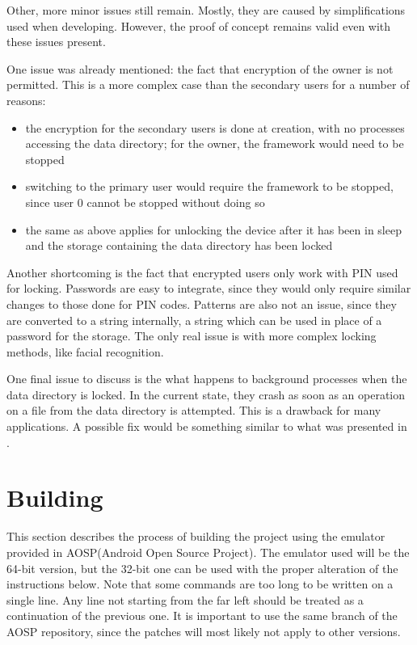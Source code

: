 Other, more minor issues still remain. Mostly, they are caused by simplifications used when developing. However, the proof of concept remains valid even with these issues present.

One issue was already mentioned: the fact that encryption of the owner is not permitted. This is a more complex case than the secondary users for a number of reasons:
\begin{itemize}
\item the encryption for the secondary users is done at creation, with no processes accessing the data directory; for the owner, the framework would need to be stopped
\item switching to the primary user would require the framework to be stopped, since user 0 cannot be stopped without doing so
\item the same as above applies for unlocking the device after it has been in sleep and the storage containing the data directory has been locked
\end{itemize}

Another shortcoming is the fact that encrypted users only work with PIN used for locking. Passwords are easy to integrate, since they would only require similar changes to those done for PIN codes. Patterns are also not an issue, since they are converted to a string internally, a string which can be used in place of a password for the storage. The only real issue is with more complex locking methods, like facial recognition.

One final issue to discuss is the what happens to background processes when the data directory is locked. In the current state, they crash as soon as an operation on a file from the data directory is attempted. This is a drawback for many applications. A possible fix would be something similar to what was presented in .

\section{Building}
\label{sec:build-multi-user}

This section describes the process of building the project using the emulator provided in AOSP(Android Open Source Project). The emulator used will be the 64-bit version, but the 32-bit one can be used with the proper alteration of the instructions below. Note that some commands are too long to be written on a single line. Any line not starting from the far left should be treated as a continuation of the previous one. It is important to use the same branch of the AOSP repository, since the patches will most likely not apply to other versions. 

